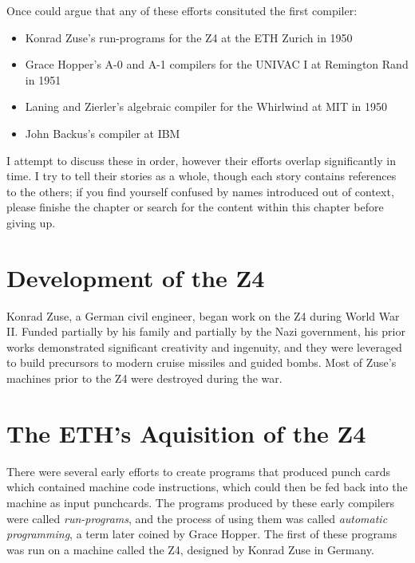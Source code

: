 \bigskip

Once could argue that any of these efforts consituted the first compiler:
\begin{itemize}
    \item Konrad Zuse's run-programs for the Z4 at the ETH Zurich in 1950
    \item Grace Hopper's A-0 and A-1 compilers for the UNIVAC I at Remington Rand in 1951
    \item Laning and Zierler's algebraic compiler for the Whirlwind at MIT in 1950
    \item John Backus's \FTNI{} compiler at IBM
\end{itemize}

I attempt to discuss these in order, however their efforts overlap significantly in time.
I try to tell their stories as a whole, though each story contains references to the others;
if you find yourself confused by names introduced out of context, please finishe the chapter
or search for the content within this chapter before giving up.

\section{Development of the Z4}

Konrad Zuse, a German civil engineer, began work on the Z4 during World War II.
Funded partially by his family and partially by the Nazi government, his prior works
demonstrated significant creativity and ingenuity, and they were leveraged to build
precursors to modern cruise missiles and guided bombs.
Most of Zuse's machines prior to the Z4 were destroyed during the war.


\section{The ETH's Aquisition of the Z4}

There were several early efforts to create programs that produced punch cards
which contained machine code instructions, which could then be fed back into the machine
as input punchcards.
The programs produced by these early compilers were called \textit{run-programs},
and the process of using them was called \textit{automatic programming}, a term later
coined by Grace Hopper.
The first of these programs was run on a machine called the Z4, designed by Konrad Zuse in Germany.

